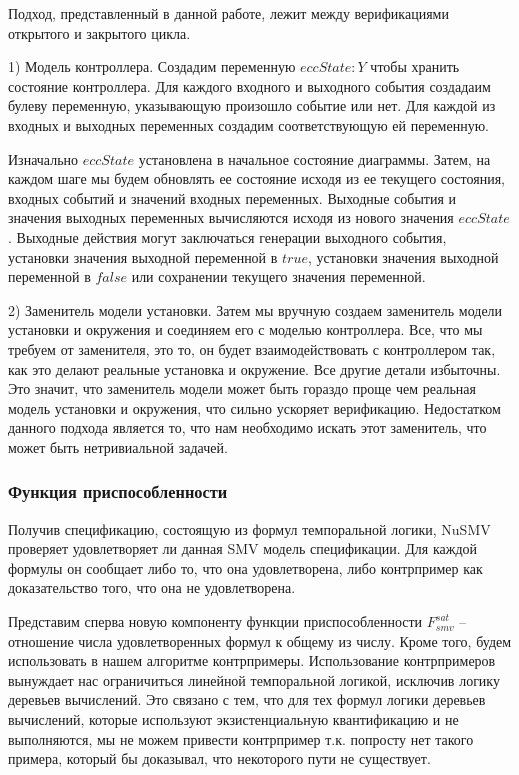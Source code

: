 \documentclass[14pt]{extarticle}
\theoremstyle{plain}
\theoremstyle{definition}
\begin{document}
Подход, представленный в данной работе, лежит между верификациями открытого и
закрытого цикла. 

1) Модель контроллера. Создадим переменную $eccState : Y$ чтобы хранить
состояние контроллера. Для каждого входного и выходного события создадаим
булеву переменную, указывающую произошло событие или нет. Для каждой из
входных и выходных переменных создадим соответствующую ей переменную.

Изначально $eccState$ установлена в начальное состояние диаграммы. Затем, на
каждом шаге мы будем обновлять ее состояние исходя из ее текущего состояния,
входных событий и значений входных переменных. Выходные события и значения
выходных переменных вычисляются исходя из нового значения $eccState$. Выходные
действия могут заключаться генерации выходного события, установки значения
выходной переменной в $true$, установки значения выходной переменной в $false$
или сохранении текущего значения переменной.

2) Заменитель модели установки. Затем мы вручную создаем заменитель модели
установки и окружения и соединяем его с моделью контроллера. Все, что мы
требуем от заменителя, это то, он будет взаимодействовать с контроллером так,
как это делают реальные установка и окружение. Все другие детали избыточны. Это
значит, что заменитель модели может быть гораздо проще чем реальная модель
установки и окружения, что сильно ускоряет верификацию. Недостатком данного
подхода является то, что нам необходимо искать этот заменитель, что может быть
нетривиальной задачей.

\subsubsection{Функция приспособленности}

Получив спецификацию, состоящую из формул темпоральной логики, NuSMV проверяет
удовлетворяет ли данная SMV модель спецификации. Для каждой формулы он сообщает
либо то, что она удовлетворена, либо контрпример как доказательство того, что
она не удовлетворена.

Представим сперва новую компоненту функции приспособленности $F^{sat}_{smv}$ --
отношение числа удовлетворенных формул к общему из числу. Кроме того, будем
использовать в нашем алгоритме контрпримеры. Использование контрпримеров
вынуждает нас ограничиться линейной темпоральной логикой, исключив логику
деревьев вычислений. Это связано с тем, что для тех формул логики деревьев
вычислений, которые используют экзистенциальную квантификацию и не выполняются,
мы не можем привести контрпример т.к. попросту нет такого примера, который бы
доказывал, что некоторого пути не существует.
\end{document}
